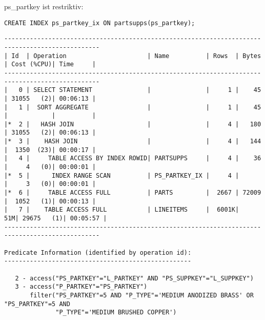 \documentclass[10pt]{article}
\begin{document}
ps\_partkey ist restriktiv:
\begin{lstlisting}[style=sql]
CREATE INDEX ps_partkey_ix ON partsupps(ps_partkey);
\end{lstlisting}
\begin{lstlisting}[style=queryexecutionplan]
------------------------------------------------------------------------------------------------
| Id  | Operation                      | Name          | Rows  | Bytes | Cost (%CPU)| Time     |
------------------------------------------------------------------------------------------------
|   0 | SELECT STATEMENT               |               |     1 |    45 | 31055   (2)| 00:06:13 |
|   1 |  SORT AGGREGATE                |               |     1 |    45 |            |          |
|*  2 |   HASH JOIN                    |               |     4 |   180 | 31055   (2)| 00:06:13 |
|*  3 |    HASH JOIN                   |               |     4 |   144 |  1350  (23)| 00:00:17 |
|   4 |     TABLE ACCESS BY INDEX ROWID| PARTSUPPS     |     4 |    36 |     4   (0)| 00:00:01 |
|*  5 |      INDEX RANGE SCAN          | PS_PARTKEY_IX |     4 |       |     3   (0)| 00:00:01 |
|*  6 |     TABLE ACCESS FULL          | PARTS         |  2667 | 72009 |  1052   (1)| 00:00:13 |
|   7 |    TABLE ACCESS FULL           | LINEITEMS     |  6001K|    51M| 29675   (1)| 00:05:57 |
------------------------------------------------------------------------------------------------
 
Predicate Information (identified by operation id):
---------------------------------------------------
 
   2 - access("PS_PARTKEY"="L_PARTKEY" AND "PS_SUPPKEY"="L_SUPPKEY")
   3 - access("P_PARTKEY"="PS_PARTKEY")
       filter("PS_PARTKEY"=5 AND "P_TYPE"='MEDIUM ANODIZED BRASS' OR "PS_PARTKEY"=5 AND 
              "P_TYPE"='MEDIUM BRUSHED COPPER')
\end{lstlisting}
\end{document}
